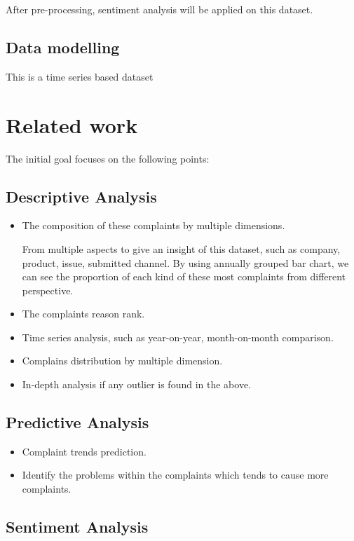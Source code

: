 \documentclass[conference]{IEEEtran}
\begin{document}
After pre-processing, sentiment analysis will be applied on this dataset.


\subsection{Data modelling }\label{AA}
This is a time series based dataset

\section{Related work}

The initial goal focuses on the following points:

\subsection{Descriptive Analysis}\label{AA}

\begin{itemize}

\item The composition of these complaints by multiple dimensions.

From multiple aspects to give an insight of this dataset, such as company, product, issue, submitted channel. By using annually grouped bar chart, we can see the proportion of each kind of these most complaints from different perspective.

\item The complaints reason rank.
\item Time series analysis, such as year-on-year, month-on-month comparison.
\item Complains distribution by multiple dimension.
\item In-depth analysis if any outlier is found in the above.
\end{itemize}


\subsection{Predictive Analysis}

\begin{itemize}

\item Complaint trends prediction.
\item Identify the problems within the complaints which tends to cause more complaints.
\end{itemize}


\subsection{Sentiment Analysis}
\end{document}
